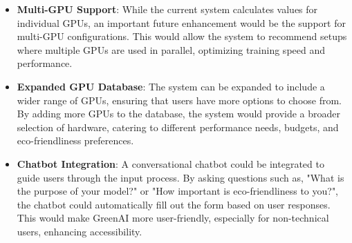 \documentclass{report}
\begin{document}
\begin{itemize}
    \item \textbf{Multi-GPU Support}: While the current system calculates values for individual GPUs, an important future enhancement would be the support for multi-GPU configurations. This would allow the system to recommend setups where multiple GPUs are used in parallel, optimizing training speed and performance.

    \item \textbf{Expanded GPU Database}: The system can be expanded to include a wider range of GPUs, ensuring that users have more options to choose from. By adding more GPUs to the database, the system would provide a broader selection of hardware, catering to different performance needs, budgets, and eco-friendliness preferences. 


    \item \textbf{Chatbot Integration}: A conversational chatbot could be integrated to guide users through the input process. By asking questions such as, "What is the purpose of your model?" or "How important is eco-friendliness to you?", the chatbot could automatically fill out the form based on user responses. This would make GreenAI more user-friendly, especially for non-technical users, enhancing accessibility.

\end{itemize}



\printbibliography
\end{document}
